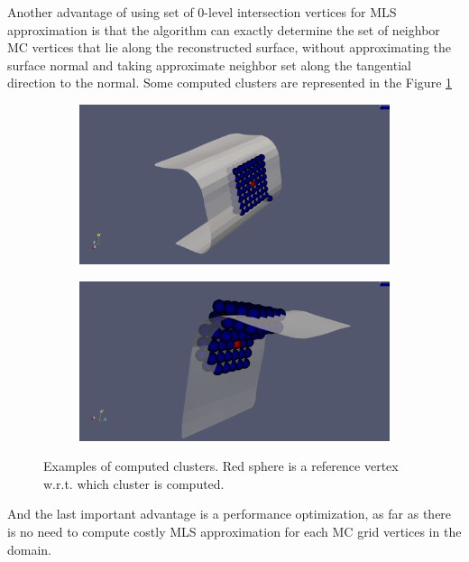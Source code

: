Another advantage of using set of 0-level intersection vertices for MLS approximation is that the algorithm can exactly determine the set of neighbor MC vertices that lie along the reconstructed surface, without approximating the surface normal and taking approximate neighbor set along the tangential direction to the normal. Some computed clusters are represented in the Figure \ref{fig:clusters}\\
\begin{figure}[H]
	\begin{center}
		\begin{subfigure}[b]{0.45\textwidth}
			\includegraphics[width=\textwidth]{figures/MlsCluster.png}
		\end{subfigure}
		\begin{subfigure}[b]{0.45\textwidth}
			\includegraphics[width=\textwidth]{figures/MlsCluster2.png}
		\end{subfigure}
	\end{center}
	\caption{Examples of computed clusters. Red sphere is a reference vertex w.r.t. which cluster is computed.}
	\label{fig:clusters}
\end{figure}

And the last important advantage is a performance optimization, as far as there is no need to compute costly MLS approximation for each MC grid vertices in the domain.\\


